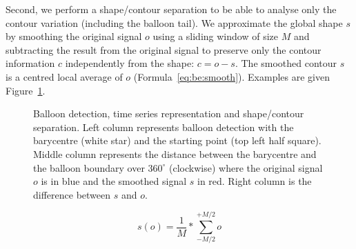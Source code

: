 Second, we perform a shape/contour separation to be able to analyse only the contour variation (including the balloon tail). We approximate the global shape $s$ by smoothing the original signal $o$ using a sliding window of size $M$ and subtracting the result from the original signal to preserve only the contour information $c$ independently from the shape: $c = o - s$. The smoothed contour $s$ is a centred local average of $o$ (Formula~\ref{eq:be:smooth}).
Examples are given Figure~\ref{fig:be:time_series}.


	\begin{figure}[!ht]	%
	  \centering
		\caption[Balloon contour time series]{Balloon detection, time series representation and shape/contour separation. Left column represents balloon detection with the barycentre (white star) and the starting point (top left half square). Middle column represents the distance between the barycentre and the balloon boundary over $360^\circ$ (clockwise) where the original signal $o$ is in blue and the smoothed signal $s$ in red. Right column is the difference between $s$ and $o$.}
		\label{fig:be:time_series}
	\end{figure}

\begin{equation}
\label{eq:be:smooth}
 s(o) = \frac{1}{M} * \sum_{-M/2}^{+M/2} o
\end{equation}



